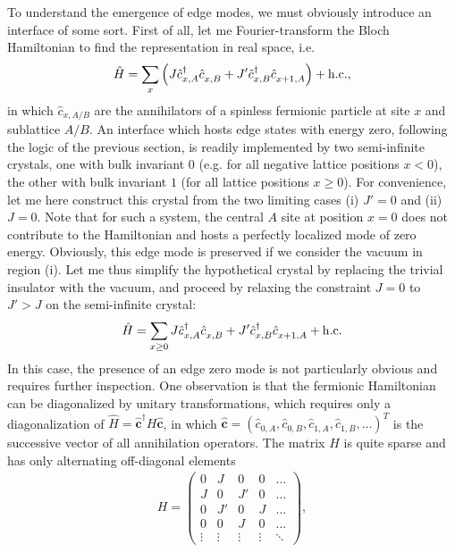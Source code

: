 To understand the emergence of edge modes, we must obviously introduce an interface of some sort.
First of all, let me Fourier-transform the Bloch Hamiltonian to find the representation in real space, i.e.
\begin{align}
    \hat H = \sum_x \brlr{J\hat c^\dag_{x,A}\hat c^\pdag_{x,B} + J' \hat c^\dag_{x,B}\hat c^\pdag_{x+1,A}} + \hc,
\end{align}
in which $\hat c_{x,A/B}$ are the annihilators of a spinless fermionic particle at site $x$ and sublattice $A/B$.
An interface which hosts edge states with energy zero, following the logic of the previous section, is readily implemented by two semi-infinite crystals, one with bulk invariant $0$ (e.g. for all negative lattice positions $x<0$), the other with bulk invariant $1$ (for all lattice positions $x\geq0$).
For convenience, let me here construct this crystal from the two limiting cases (i) $J'=0$ and (ii) $J=0$.
Note that for such a system, the central $A$ site at position $x=0$ does not contribute to the Hamiltonian and hosts a perfectly localized mode of zero energy.
Obviously, this edge mode is preserved if we consider the vacuum in region (i).
Let me thus simplify the hypothetical crystal by replacing the trivial insulator with the vacuum, and proceed by relaxing the constraint $J=0$ to $J'>J$ on the semi-infinite crystal:
\begin{align}
    \hat H = \sum_{x\geq0} J \hat c^\dag_{x,A}\hat c^\pdag_{x,B} + J' \hat c^\dag_{x,B}\hat c^\pdag_{x+1,A} + \hc
\end{align}
In this case, the presence of an edge zero mode is not particularly obvious and requires further inspection.
One observation is that the fermionic Hamiltonian can be diagonalized by unitary transformations, which requires only a diagonalization of $\hat H = \hat{\bm c}^\dag H \hat{\bm c}$, in which $\hat{\bm c}=(\hat c_{0,A},\hat c_{0,B},\hat c_{1,A},\hat c_{1,B},\dots)^T$ is the successive vector of all annihilation operators.
The matrix $H$ is quite sparse and has only alternating off-diagonal elements
\begin{align}
    H =
    \begin{pmatrix}
        0 & J & 0 & 0 &\dots \\
        J & 0 & J' & 0 & \dots \\
        0 & J' & 0 & J & \dots \\
        0 & 0 & J & 0 & \dots \\
        \vdots & \vdots & \vdots & \vdots & \ddots
    \end{pmatrix},
\end{align}
